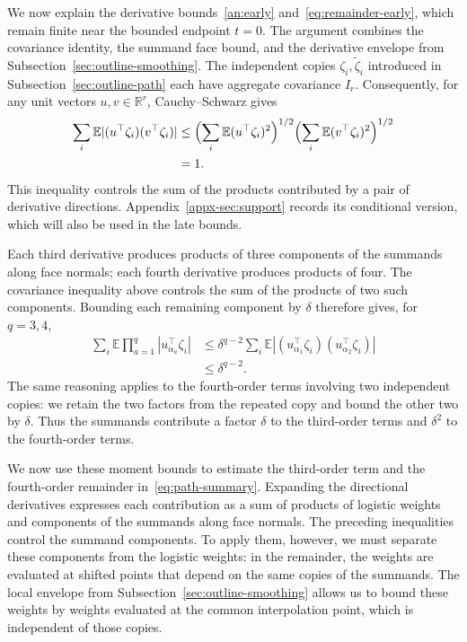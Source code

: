 \documentclass[11pt,letterpaper]{article}
\theoremstyle{remark}
\newcommand{\E}{\mathbb E}
\newcommand{\R}{\mathbb R}
\begin{document}
We now explain the derivative bounds~\eqref{an:early}
and~\eqref{eq:remainder-early}, which remain finite near the bounded
endpoint \(t=0\). The argument combines the covariance identity,
the summand face bound, and the derivative envelope from
Subsection~\ref{sec:outline-smoothing}. The independent copies
\(\zeta_i,\widetilde\zeta_i\) introduced in
Subsection~\ref{sec:outline-path} each have aggregate covariance
\(I_r\). Consequently, for any
unit vectors \(u,v\in\R^r\),
Cauchy--Schwarz gives
\[
 \begin{aligned}
 \sum_i\E|(u^\top\zeta_i)(v^\top\zeta_i)|
 &\le\Bigl(\sum_i\E(u^\top\zeta_i)^2\Bigr)^{1/2}
       \Bigl(\sum_i\E(v^\top\zeta_i)^2\Bigr)^{1/2}\\
 &=1.
 \end{aligned}
\]
This inequality controls the sum of the products contributed by a pair
of derivative directions. Appendix~\ref{appx-sec:support} records its
conditional version, which will also be used in the late bounds.

Each third derivative produces products of three components of the
summands along face normals; each fourth derivative produces products
of four. The covariance inequality above controls the sum of the
products of two such components. Bounding each remaining component
by \(\delta\) therefore gives, for \(q=3,4\),
\[
 \begin{aligned}
 \sum_i\E\prod_{a=1}^{q}|u_{\alpha_a}^{\top}\zeta_i|
 &\le\delta^{q-2}\sum_i\E
     |(u_{\alpha_1}^{\top}\zeta_i)(u_{\alpha_2}^{\top}\zeta_i)|\\
 &\le\delta^{q-2}.
 \end{aligned}
\]
The same reasoning applies to the fourth-order terms involving two
independent copies: we retain the two factors from the repeated copy
and bound the other two by \(\delta\). Thus the summands contribute a
factor \(\delta\) to the third-order terms and \(\delta^2\) to the
fourth-order terms.

We now use these moment bounds to estimate the third-order term and
the fourth-order remainder in~\eqref{eq:path-summary}. Expanding the
directional derivatives expresses each contribution as a sum of
products of logistic weights and components of the summands along
face normals. The preceding inequalities control the summand
components. To apply them, however, we must separate these components
from the logistic weights: in the remainder, the weights are
evaluated at shifted points that depend on the same copies of the
summands. The local envelope from
Subsection~\ref{sec:outline-smoothing} allows us to bound these weights
by weights evaluated at the common interpolation point, which is
independent of those copies.
\end{document}
